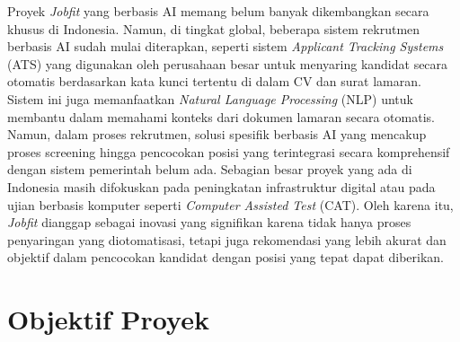 \documentclass[journal,article,submit,pdftex,moreauthors]{Definitions/mdpi}
\begin{document}
Proyek \textit{Jobfit} yang berbasis AI memang belum banyak dikembangkan secara khusus di Indonesia. Namun, di tingkat global, beberapa sistem rekrutmen berbasis AI sudah mulai diterapkan, seperti sistem \textit{Applicant Tracking Systems} (ATS) yang digunakan oleh perusahaan besar untuk menyaring kandidat secara otomatis berdasarkan kata kunci tertentu di dalam CV dan surat lamaran. Sistem ini juga memanfaatkan \textit{Natural Language Processing} (NLP) untuk membantu dalam memahami konteks dari dokumen lamaran secara otomatis. Namun, dalam proses rekrutmen, solusi spesifik berbasis AI yang mencakup proses screening hingga pencocokan posisi yang terintegrasi secara komprehensif dengan sistem pemerintah belum ada. Sebagian besar proyek yang ada di Indonesia masih difokuskan pada peningkatan infrastruktur digital atau pada ujian berbasis komputer seperti \textit{Computer Assisted Test} (CAT). Oleh karena itu, \textit{Jobfit} dianggap sebagai inovasi yang signifikan karena tidak hanya proses penyaringan yang diotomatisasi, tetapi juga rekomendasi yang lebih akurat dan objektif dalam pencocokan kandidat dengan posisi yang tepat dapat diberikan.

\section{Objektif Proyek}
\end{document}
